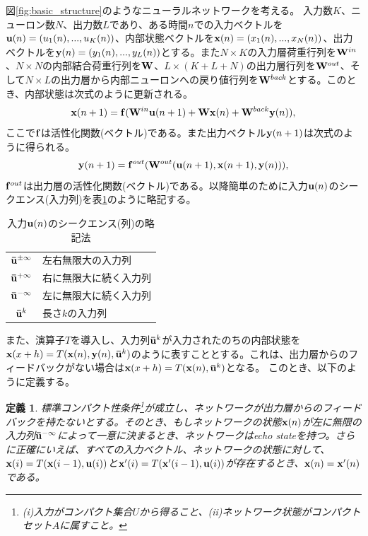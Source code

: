 \documentclass{jsarticle}
\newtheorem{dfn}{定義}
\begin{document}
図\ref{fig:basic_structure}のようなニューラルネットワークを考える。
入力数$K$、ニューロン数$N$、出力数$L$であり、ある時間$n$での入力ベクトルを${\bf u}(n) = (u_1(n),...,u_K(n))$、内部状態ベクトルを${\bf x}(n) = (x_1(n),...,x_N(n))$、出力ベクトルを${\bf y}(n) = (y_1(n),...,y_L(n))$とする。また$N\times K$の入力層荷重行列を${\bf W}^{in}$、$N\times N$の内部結合荷重行列を$\bf W$、$L\times (K+L+N)$の出力層行列を${\bf W}^{out}$、そして$N\times L$の出力層から内部ニューロンへの戻り値行列を${\bf W}^{back}$とする。このとき、内部状態は次式のように更新される。
\begin{equation}
	{\bf x}(n+1)={\bf f}({\bf W}^{in}{\bf u}(n+1)+{\bf W}{\bf x}(n)+{\bf W}^{back}{\bf y}(n)),
	\label{eq:increment_x}
\end{equation}
ここで$\bf f$は活性化関数(ベクトル)である。また出力ベクトル${\bf y}(n+1)$は次式のように得られる。
\begin{equation}
	{\bf y}(n+1)={\bf f}^{out}({\bf W}^{out}({\bf u}(n+1),{\bf x}(n+1),{\bf y}(n))),
	\label{eq:increment_y}
\end{equation}
${\bf f}^{out}$は出力層の活性化関数(ベクトル)である。以降簡単のために入力${\bf u}(n)$のシークエンス(入力列)を表\ref{tb:u_shorthand}のように略記する。
\begin{table}[htb]
\caption{入力${\bf u}(n)$のシークエンス(列)の略記法}
\centering
  \begin{tabular}{cl}
    ${\bf \bar u}^{\pm \infty}$ & 左右無限大の入力列\\
    ${\bf \bar u}^{+ \infty}$ & 右に無限大に続く入力列\\
    ${\bf \bar u}^{- \infty}$ & 左に無限大に続く入力列\\
    ${\bf \bar u}^{k}$ & 長さ$k$の入力列
  \end{tabular}
  \label{tb:u_shorthand}
\end{table}
また、演算子$T$を導入し、入力列${\bf \bar u}^{k}$が入力されたのちの内部状態を${\bf x}(x+h) = T({\bf x}(n),{\bf y}(n),{\bf \bar u}^{k})$のように表すこととする。これは、出力層からのフィードバックがない場合は${\bf x}(x+h) = T({\bf x}(n),{\bf \bar u}^{k})$となる。
このとき、以下のように定義する。
\begin{dfn}
標準コンパクト性条件\footnote{(i)入力がコンパクト集合$U$から得ること、(ii)ネットワーク状態がコンパクトセット$A$に属すこと。}が成立し、ネットワークが出力層からのフィードバックを持たないとする。そのとき、もしネットワークの状態${\bf x}(n)$が左に無限の入力列${\bf \bar u}^{- \infty}$によって一意に決まるとき、ネットワークはecho stateを持つ。さらに正確にいえば、すべての入力ベクトル、ネットワークの状態に対して、${\bf x}(i) = T({\bf x}(i-1),{\bf u}(i))$と${\bf x'}(i) = T({\bf x'}(i-1),{\bf u}(i))$が存在するとき、${\bf x}(n)={\bf x'}(n)$である。
\end{dfn}
\end{document}
